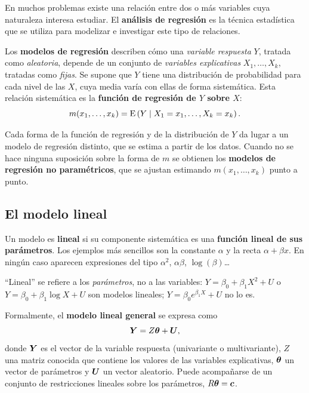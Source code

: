 En muchos problemas existe una relación entre dos o más variables cuya naturaleza interesa
estudiar. El \textbf{análisis de regresión} es la técnica estadística que se utiliza para
modelizar e investigar este tipo de relaciones.

\begin{definicion}
  Los \textbf{modelos de regresión} describen cómo una \emph{variable respuesta} $Y$, tratada
  como \emph{aleatoria}, depende de un conjunto de \emph{variables explicativas}
  $X_1,\ldots,X_k$, tratadas como \emph{fijas}. Se supone que $Y$ tiene una distribución de
  probabilidad para cada nivel de las $X$, cuya media varía con ellas de forma sistemática.
  Esta relación sistemática es la \textbf{función de regresión de $Y$ sobre $X$}:
  \[
    m(x_1,\ldots,x_k) = \operatorname{E}\left(Y \mid X_1=x_1,\ldots,X_k=x_k\right).
  \]
\end{definicion}

Cada forma de la función de regresión y de la distribución de $Y$ da lugar a un modelo de
regresión distinto, que se estima a partir de los datos. Cuando no se hace ninguna suposición
sobre la forma de $m$ se obtienen los \textbf{modelos de regresión no paramétricos}, que se
ajustan estimando $m(x_1,\ldots,x_k)$ punto a punto.

\subsection{El modelo lineal}

\begin{definicion}
  Un modelo es \textbf{lineal} si su componente sistemática es una \textbf{función lineal de
  sus parámetros}. Los ejemplos más sencillos son la constante $\alpha$ y la recta
  $\alpha+\beta x$. En ningún caso aparecen expresiones del tipo $\alpha^2$, $\alpha\beta$,
  $\log(\beta)$\ldots
\end{definicion}

\begin{nota}
  ``Lineal'' se refiere a los \emph{parámetros}, no a las variables: $Y=\beta_0+\beta_1X^2+U$
  o $Y=\beta_0+\beta_1\log X+U$ son modelos lineales; $Y=\beta_0 e^{\beta_1X}+U$ no lo es.
\end{nota}

Formalmente, el \textbf{modelo lineal general} se expresa como
\[
  \bm{Y} = Z\bm{\theta} + \bm{U},
\]
donde $\bm{Y}$ es el vector de la variable respuesta (univariante o multivariante), $Z$ una
matriz conocida que contiene los valores de las variables explicativas, $\bm{\theta}$ un
vector de parámetros y $\bm{U}$ un vector aleatorio. Puede acompañarse de un conjunto de
restricciones lineales sobre los parámetros, $R\bm{\theta}=\bm{c}$.

